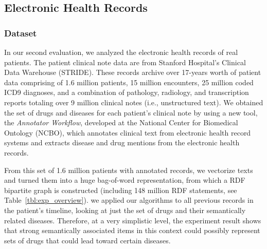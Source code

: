 \subsection{Electronic Health Records}
\subsubsection{Dataset}
In our second evaluation, we analyzed the electronic health records of real patients. The patient clinical note data are from Stanford Hospital's Clinical Data Warehouse (STRIDE). These records archive over 17-years worth of patient data comprising of 1.6 million patients, 15 million encounters, 25 million coded ICD9 diagnoses, and a combination of pathology, radiology, and transcription reports totaling over 9 million clinical notes (i.e., unstructured text).
We obtained the set of drugs and diseases for each patient's clinical note by using a new tool, the \emph{Annotator Workflow}, developed at the National Center for Biomedical Ontology (NCBO), which annotates clinical text from electronic health record systems and extracts disease and drug mentions from the electronic health records.


From this set of 1.6 million patients with annotated records, we vectorize texts and turned them into a huge bag-of-word representation, from which a RDF bipartite graph is constructed (including 148 million RDF statements, see Table~\ref{tbl:exp_overview}). we applied our algorithms to all previous records in the patient's timeline, looking at just the set of drugs and their semantically related diseases.  Therefore, at a very simplistic level, the experiment result shows that strong semantically associated items in this context could possibly represent sets of drugs that could lead toward certain diseases.

